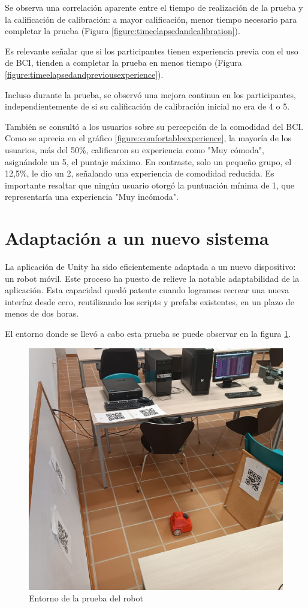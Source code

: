 Se observa una correlación aparente entre el tiempo de realización de la prueba y la calificación de calibración: a mayor calificación, menor tiempo necesario para completar la prueba (Figura \ref{figure:timeelapsedandcalibration}).



Es relevante señalar que si los participantes tienen experiencia previa con el uso de BCI, tienden a completar la prueba en menos tiempo (Figura \ref{figure:timeelapsedandpreviousexperience}).



Incluso durante la prueba, se observó una mejora continua en los participantes, independientemente de si su calificación de calibración inicial no era de 4 o 5.



También se consultó a los usuarios sobre su percepción de la comodidad del BCI. Como se aprecia en el gráfico \ref{figure:comfortableexperience}, la mayoría de los usuarios, más del 50\%, calificaron su experiencia como "Muy cómoda", asignándole un 5, el puntaje máximo. En contraste, solo un pequeño grupo, el 12,5\%, le dio un 2, señalando una experiencia de comodidad reducida. Es importante resaltar que ningún usuario otorgó la puntuación mínima de 1, que representaría una experiencia "Muy incómoda".

\section{Adaptación a un nuevo sistema}

La aplicación de Unity ha sido eficientemente adaptada a un nuevo dispositivo: un robot móvil. Este proceso ha puesto de relieve la notable adaptabilidad de la aplicación. Esta capacidad quedó patente cuando logramos recrear una nueva interfaz desde cero, reutilizando los scripts y prefabs existentes, en un plazo de menos de dos horas.



El entorno donde se llevó a cabo esta prueba se puede observar en la figura \ref{figure:entorno-prueba-robot}.

\begin{figure}[!htb]
   \centering
    \includegraphics[width=0.6\linewidth]{figures/entorno-prueba-robot.jpg}
   \caption{Entorno de la prueba del robot}
   \label{figure:entorno-prueba-robot}
\end{figure}


